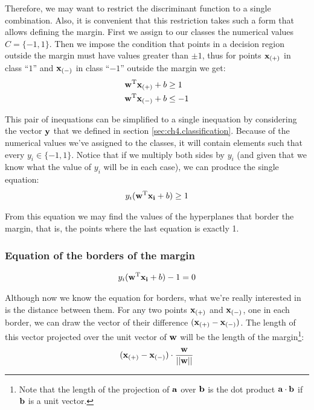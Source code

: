 Therefore, we may want to restrict the discriminant function to a single com\-bi\-na\-tion. Also, it is convenient that this restriction takes such a form that allows defining the margin. First we assign to our classes the numerical values $C = \{-1, 1\}$. Then we impose the condition that points in a decision region outside the margin must have values greater than $\pm 1$, thus for points $\mathbf{x}_{(+)}$ in class “$1$” and $\mathbf{x}_{(-)}$ in class “$-1$” outside the margin we get:
\begin{align*}
    \mathbf{w}^{\text{T}} \mathbf{x}_{(+)} + b &\ge 1\\
    \mathbf{w}^{\text{T}} \mathbf{x}_{(-)} + b &\le -1
\end{align*}

This pair of inequations can be simplified to a single inequation by considering the vector $\mathbf{y}$ that we defined in section \ref{sec:ch4.classification}. Because of the numerical values we've assigned to the classes, it will contain elements such that every $y_i \in \{-1, 1\}$. Notice that if we multiply both sides by $y_i$ (and given that we know what the value of $y_i$ will be in each case), we can produce the single equation:
\begin{align}\label{eq:svmconstrain}
    y_i (\mathbf{w}^{\text{T}} \mathbf{x_i} + b) \ge 1
\end{align}

From this equation we may find the values of the hyperplanes that border the margin, that is, the points where the last equation is exactly 1. 

\subsubsection*{Equation of the borders of the margin}
\begin{align}\label{eq:gutters}
    y_i (\mathbf{w}^{\text{T}} \mathbf{x_i} + b) -1 = 0
\end{align}

Although now we know the equation for borders, what we're really interested in is the distance between them. For any two points $\mathbf{x}_{(+)}$ and $\mathbf{x}_{(-)}$, one in each border, we can draw the vector of their difference $(\mathbf{x}_{(+)} - \mathbf{x}_{(-)})$. The length of this vector projected over the unit vector of $\mathbf{w}$ will be the length of the margin\footnote{Note that the length of the projection of $\mathbf{a}$ over $\mathbf{b}$ is the dot product $\mathbf{a} \cdot \mathbf{b}$ if $\mathbf{b}$ is a unit vector.}:
\begin{align*}
    (\mathbf{x}_{(+)} - \mathbf{x}_{(-)}) \cdot \frac{\mathbf{w}}{||\mathbf{w}||}
\end{align*}

